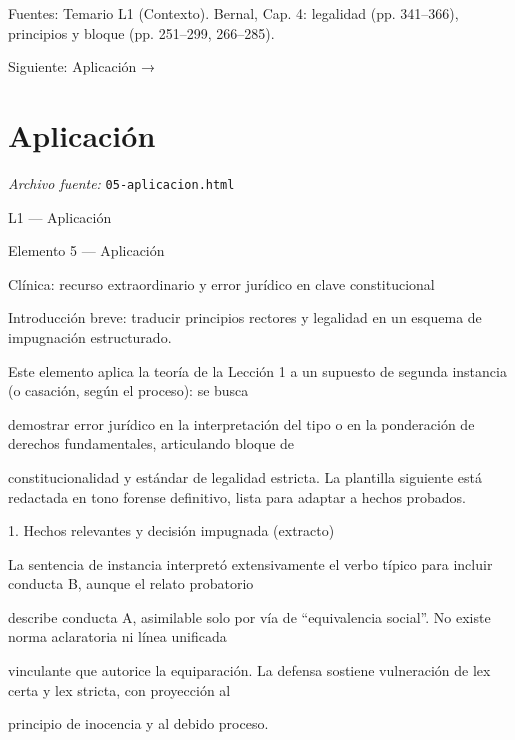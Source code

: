 \documentclass[11pt,a4paper]{article}
\begin{document}
      Fuentes: Temario L1 (Contexto). Bernal, Cap. 4: legalidad (pp. 341–366), principios y bloque (pp. 251–299, 266–285).\par


    Siguiente: Aplicación →\par

\section{Aplicaci\'on}
\noindent\textit{Archivo fuente:} \texttt{05-aplicacion.html}

L1 — Aplicación\par





    Elemento 5 — Aplicación\par
    Clínica: recurso extraordinario y error jurídico en clave constitucional\par

    Introducción breve: traducir principios rectores y legalidad en un esquema de impugnación estructurado.\par


      Este elemento aplica la teoría de la Lección 1 a un supuesto de segunda instancia (o casación, según el proceso): se busca\par
      demostrar error jurídico en la interpretación del tipo o en la ponderación de derechos fundamentales, articulando bloque de\par
      constitucionalidad y estándar de legalidad estricta. La plantilla siguiente está redactada en tono forense definitivo, lista para adaptar a hechos probados.\par



      1. Hechos relevantes y decisión impugnada (extracto)\par


        La sentencia de instancia interpretó extensivamente el verbo típico para incluir conducta B, aunque el relato probatorio\par
        describe conducta A, asimilable solo por vía de “equivalencia social”. No existe norma aclaratoria ni línea unificada\par
        vinculante que autorice la equiparación. La defensa sostiene vulneración de lex certa y lex stricta, con proyección al\par
        principio de inocencia y al debido proceso.\par
\end{document}
